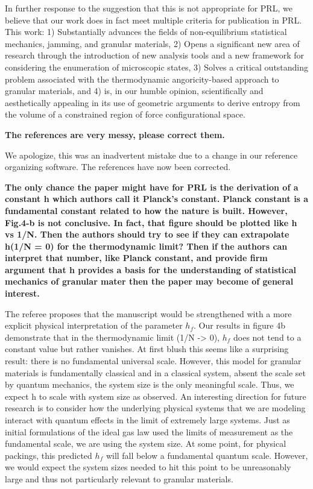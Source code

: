 \documentclass[a4paper,11pt]{article}
\begin{document}
In further response to the suggestion that this is not appropriate for PRL, we believe that our work does in fact meet multiple criteria for publication in PRL. This work: 1) Substantially advances the fields of non-equilibrium statistical mechanics, jamming, and granular materials, 2) Opens a significant new area of research through the introduction of new analysis tools and a new framework for considering the enumeration of microscopic states, 3) Solves a critical outstanding problem associated with the thermodynamic angoricity-based approach to granular materials, and 4) is, in our humble opinion, scientifically and aesthetically appealing in its use of geometric arguments to derive entropy from the volume of a constrained region of force configurational space.

\vskip 0.5cm
\textbf{The references are very messy, please correct them.}
\vskip 0.3cm

We apologize, this was an inadvertent mistake due to a change in our reference organizing software. The references have now been corrected.

\vskip 0.5cm
\textbf{The only chance the paper might have for PRL is the derivation of a constant h which authors call it Planck’s constant. Planck constant is a fundamental constant related to how the nature is built. However, Fig.4-b is not conclusive. In fact, that figure should be plotted like h vs 1/N. Then the authors should try to see if they can extrapolate h(1/N = 0) for the thermodynamic limit? Then if the authors can interpret that number, like Planck constant, and provide firm argument that h provides a basis for the understanding of statistical mechanics of granular mater then the paper may become of general interest.}
\vskip 0.3cm

The referee proposes that the manuscript would be strengthened with a more explicit physical interpretation of the parameter $h_f$. Our results in figure 4b demonstrate that in the thermodynamic limit (1/N -> 0), $h_f$ does not tend to a constant value but rather vanishes. At first blush this seems like a surprising result: there is no fundamental universal scale. However, this model for granular materials is fundamentally classical and in a classical system, absent the scale set by quantum mechanics, the system size is the only meaningful scale. Thus, we expect h to scale with system size as observed. An interesting direction for future research is to consider how the underlying physical systems that we are modeling interact with quantum effects in the limit of extremely large systems. Just as initial formulations of the ideal gas law used the limits of measurement as the fundamental scale, we are using the system size. At some point, for physical packings, this predicted $h_f$ will fall below a fundamental quantum scale. However, we would expect the system sizes needed to hit this point to be unreasonably large and thus not particularly relevant to granular materials.
\end{document}
